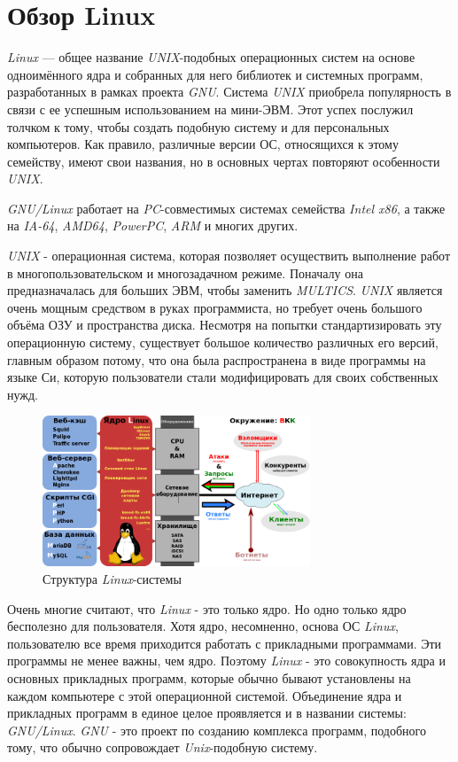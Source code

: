 \section{Обзор Linux}
\textit{Linux} — общее название \textit{UNIX}-подобных операционных систем на основе одноимённого ядра и собранных для него библиотек и системных программ, разработанных в рамках проекта \textit{GNU}.
Система \textit{UNIX} приобрела популярность в связи с ее успешным использованием на мини-ЭВМ. Этот успех послужил толчком к тому, чтобы создать подобную систему и для персональных компьютеров. Как правило, различные версии ОС, относящихся к этому семейству, имеют свои названия, но в основных чертах повторяют особенности \textit{UNIX}.

\textit{GNU/Linux} работает на \textit{PC}-совместимых системах семейства \textit{Intel x86}, а также на \textit{IA-64}, \textit{AMD64}, \textit{PowerPC}, \textit{ARM} и многих других.

\textit{UNIX} - операционная система, которая позволяет осуществить выполнение работ в многопользовательском и многозадачном режиме. Поначалу она предназначалась для больших ЭВМ, чтобы заменить \textit{MULTICS}. \textit{UNIX} является очень мощным средством в руках программиста, но требует очень большого объёма ОЗУ и пространства диска. Несмотря на попытки стандартизировать эту операционную систему, существует большое количество различных его версий, главным образом потому, что она была распространена в виде программы на языке Си, которую пользователи стали модифицировать для своих собственных нужд.

\begin{figure}[!h]
	\vspace{0.5cm}
	\begin{center}
	\includegraphics[width=8cm]{figures/LAMP_software_bundle.png}
	\end{center}
	\caption{Структура \textit{Linux}-системы}
\end{figure}

Очень многие считают, что \textit{Linux} - это только ядро. Но одно только ядро бесполезно для пользователя. Хотя ядро, несомненно, основа ОС \textit{Linux}, пользователю все время приходится работать с прикладными программами. Эти программы не менее важны, чем ядро. Поэтому \textit{Linux} - это совокупность ядра и основных прикладных программ, которые обычно бывают установлены на каждом компьютере с этой операционной системой. Объединение ядра и прикладных программ в единое целое проявляется и в названии системы: \textit{GNU/Linux}. \textit{GNU} - это проект по созданию комплекса программ, подобного тому, что обычно сопровождает \textit{Unix}-подобную систему.

